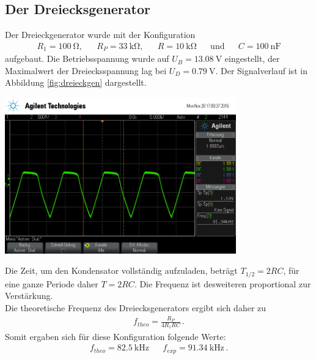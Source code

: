 \documentclass[]{scrartcl}
\begin{document}
\subsection{Der Dreiecksgenerator}
Der Dreieckgenerator wurde mit der Konfiguration
\begin{align*}
R_1=\SI{100}{\ohm}, && R_P=\SI{33}{\kilo\ohm}, && R=\SI{10}{\kilo\ohm} && \text{und} && C=\SI{100}{\nano\farad}
\end{align*}
aufgebaut. Die Betriebsspannung wurde auf $U_B=\SI{13.08}{\volt}$ eingestellt, der Maximalwert der Dreiecksspannung lag bei $U_D=\SI{0.79}{\volt}$.
Der Signalverlauf ist in Abbildung \ref{fig:dreieckgen} dargestellt.
\begin{center}
	\includegraphics[width=10cm]{images/dreieckgen.png}
	\label{fig:dreieckgen}
\end{center}
Die Zeit, um den Kondensator vollständig aufzuladen, beträgt $T_ {1/2}=2RC$, für eine ganze Periode daher $T=2RC$. Die Frequenz ist desweiteren proportional zur Verstärkung. \\
Die theoretische Frequenz des Dreiecksgenerators ergibt sich daher zu
\begin{align}
f_{theo}=\frac{R_P}{4R_1RC}\,.
\end{align}
Somit ergaben sich für diese Konfiguration folgende Werte:
\begin{align}
f_{theo}=\SI{82.5}{\kilo\hertz} &  & f_{exp}=\SI{91.34}{\kilo\hertz}\,.
\end{align}
\end{document}
